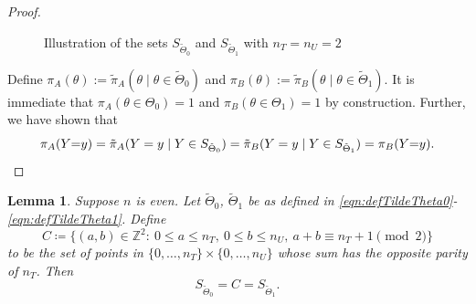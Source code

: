 \documentclass[12pt,reqno]{amsart}
\theoremstyle{theorem}
\newtheorem{lem}{Lemma}[section]
\theoremstyle{definition}
\newcommand{\0}{\mathbf{0}}
\newcommand{\1}{\mathbf{1}}
\begin{document}
\begin{proof}
\begin{figure}[!ht]

    \caption{Illustration of the sets $S_{\tilde{\Theta}_0}$ and $S_{\tilde{\Theta}_1}$ with $n_T = n_U = 2$}
    \label{fig:supports-same}
\end{figure}

Define $\pi_A(\theta) := \tilde{\pi}_A(\theta \mid \theta \in \tilde{\Theta}_0)$ and
$\pi_B(\theta) := \tilde{\pi}_B(\theta \mid \theta \in \tilde{\Theta}_1)$. It is immediate
that $\pi_A(\theta \in \Theta_0) = 1$ and $\pi_B(\theta \in \Theta_1) = 1$ by
construction. Further, we have shown that \[
\pi_A(Y{=}y) = \tilde \pi_A(Y=y \mid Y \in S_{\tilde{\Theta}_0}) = \tilde \pi_B(Y=y \mid Y
\in S_{\tilde{\Theta}_1}) = \pi_B(Y{=}y) .
\qedhere
\]
\end{proof}


\begin{lem}
\label{lem:equivsupports}
Suppose $n$ is even. Let $\tilde{\Theta}_0$, $\tilde{\Theta}_1$ be as defined in \eqref{eqn:defTildeTheta0}-\eqref{eqn:defTildeTheta1}. Define
\[
C\coloneqq\bigl\{(a,b)\in\mathbb{Z}^2:\ 0\le a\le n_T,\ 0\le b\le n_U,\ a+b\equiv n_T+1\pmod 2\bigr\}
\]
to be the set of points in $\{0,\ldots,n_T\} \times \{0,\ldots,n_U\}$ whose sum has the opposite parity of $n_T$. Then
\[
S_{\tilde{\Theta}_0} = C =S_{\tilde{\Theta}_1}.
\]
\end{lem}
\end{document}
